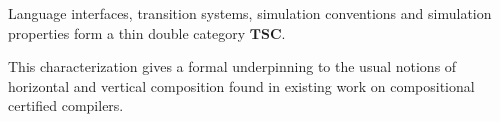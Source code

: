 \documentclass[acmsmall,screen,review,anonymous]{acmart}
\renewcommand{\preceq}{\preccurlyeq}
\begin{document}
\begin{theorem}
Language interfaces,
transition systems,
simulation conventions and
simulation properties
form a thin double category $\mathbf{TSC}$.
\end{theorem}

This characterization
gives a formal underpinning to the usual notions of
horizontal and vertical composition
found in existing work on compositional certified compilers.

%
%
\end{document}
